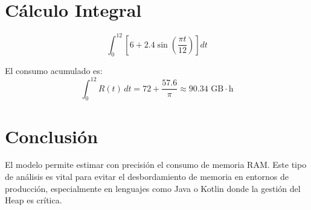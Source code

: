\documentclass[12pt,a4paper]{article}
\begin{document}
\section{Cálculo Integral}

\[
\int_{0}^{12} \left[ 6 + 2.4\sin\left(\frac{\pi t}{12}\right) \right] dt
\]

\begin{cajaresultado}
El consumo acumulado es:
\[
\int_{0}^{12} R(t)\, dt = 72 + \frac{57.6}{\pi} \approx 90.34 \text{ GB}\cdot\text{h}
\]
\end{cajaresultado}

\section{Conclusión}

El modelo permite estimar con precisión el consumo de memoria RAM. Este tipo de análisis es vital para evitar el desbordamiento de memoria en entornos de producción, especialmente en lenguajes como Java o Kotlin donde la gestión del Heap es crítica.
\end{document}
